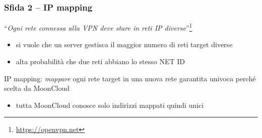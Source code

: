 \begin{frame}
    \frametitle{Sfida 2 -- IP mapping}
    ``\textit{Ogni rete connessa alla VPN deve stare in reti IP diverse}''\footnote{\url{https://openvpn.net}}
    \begin{itemize}
        \item si vuole che un server gestisca il maggior numero di reti target diverse
        \item alta probabilità che due reti abbiano lo stesso NET ID
    \end{itemize}

    \alert{IP mapping}: \textit{mappare} ogni rete target in una nuova rete
    \alert{garantita univoca} perché scelta da MoonCloud
    \begin{itemize}
        \item tutta MoonCloud conosce solo indirizzi mappati quindi unici
    \end{itemize}
\end{frame}

